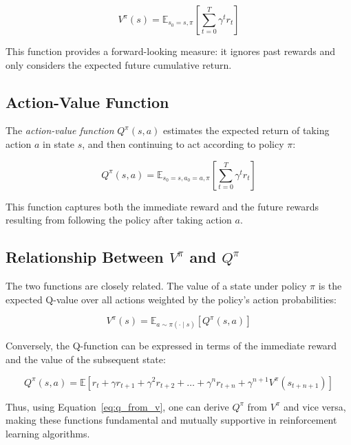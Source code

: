 \documentclass[a4paper,oneside]{book}
\theoremstyle{definition}
\begin{document}
\begin{equation}
V^\pi(s) = \mathbb{E}_{s_0 = s, \pi} \left[ \sum_{t=0}^T \gamma^t r_t \right]
\label{eq:v_function}
\end{equation}

This function provides a forward-looking measure: it ignores past rewards and only considers the expected future cumulative return.

\subsection*{Action-Value Function}

The \textit{action-value function} \( Q^\pi(s, a) \) estimates the expected return of taking action \( a \) in state \( s \), and then continuing to act according to policy \( \pi \):

\begin{equation}
Q^\pi(s, a) = \mathbb{E}_{s_0 = s, a_0 = a, \pi} \left[ \sum_{t=0}^T \gamma^t r_t \right]
\label{eq:q_function}
\end{equation}

This function captures both the immediate reward and the future rewards resulting from following the policy after taking action \( a \).

\subsection*{Relationship Between \( V^\pi \) and \( Q^\pi \)}

The two functions are closely related. The value of a state under policy \( \pi \) is the expected Q-value over all actions weighted by the policy’s action probabilities:

\begin{equation}
V^\pi(s) = \mathbb{E}_{a \sim \pi(\cdot \mid s)} \left[ Q^\pi(s, a) \right]
\label{eq:v_from_q}
\end{equation}

Conversely, the Q-function can be expressed in terms of the immediate reward and the value of the subsequent state:

\begin{equation}
Q^\pi(s, a) = \mathbb{E} \left[ r_t + \gamma r_{t+1} + \gamma^2 r_{t+2} + \dots + \gamma^n r_{t+n} + \gamma^{n+1} V^\pi(s_{t+n+1}) \right]
\label{eq:q_from_v}
\end{equation}

Thus, using Equation~\eqref{eq:q_from_v}, one can derive \( Q^\pi \) from \( V^\pi \) and vice versa, making these functions fundamental and mutually supportive in reinforcement learning algorithms.
\end{document}
